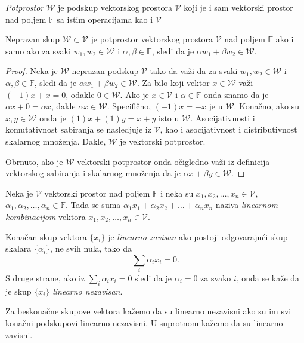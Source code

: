\documentclass{article}
\begin{document}
\begin{definition}
  \textit{Potprostor} $\mathcal{W}$ je podskup vektorskog prostora $\mathcal{V}$ koji je i sam vektorski prostor nad poljem $\mathbb{F}$ sa istim operacijama kao i $\mathcal{V}$
\end{definition}

\begin{theorem}
  Neprazan skup $\mathcal{W} \subset \mathcal{V}$ je potprostor vektorskog prostora $\mathcal{V}$ nad poljem $\mathbb{F}$ ako i samo ako za svaki $w_1, w_2 \in \mathcal{W}$ i $\alpha, \beta \in \mathbb{F}$, sledi da je $\alpha w_1 + \beta w_2 \in \mathcal{W}$.
\end{theorem}

\begin{proof}
  Neka je $\mathcal{W}$ neprazan podskup $\mathcal{V}$ tako da važi da za svaki $w_1, w_2 \in \mathcal{W}$ i $\alpha, \beta \in \mathbb{F}$, sledi da je $\alpha w_1 + \beta w_2 \in \mathcal{W}$.
  Za bilo koji vektor $x \in \mathcal{W}$ važi $(-1) x + x = 0$, odakle $0 \in \mathcal{W}$.
  Ako je $x \in \mathcal{V}$ i $\alpha \in \mathbb{F}$ onda znamo da je $\alpha x + 0 = \alpha x$, dakle $\alpha x \in \mathcal{W}$.
  Specifično, $(-1) x = -x$ je u $\mathcal{W}$.
  Konačno, ako su $x, y \in \mathcal{W}$ onda je $(1) x + (1) y = x + y$ isto u $\mathcal{W}$.
  Asocijativnosti i komutativnost sabiranja se nasledjuje iz $\mathcal{V}$, kao i asocijativnost i distributivnost skalarnog množenja.
  Dakle, $\mathcal{W}$ je vektorski potprostor.

  Obrnuto, ako je $\mathcal{W}$ vektorski potprostor onda očigledno važi iz definicija vektorskog sabiranja i skalarnog množenja da je $\alpha x + \beta y \in \mathcal{W}$.
\end{proof}

\begin{definition}
  Neka je $\mathcal{V}$ vektorski prostor nad poljem $\mathbb{F}$ i neka su $x_1, x_2, \ldots, x_n \in \mathcal{V}$, $\alpha_1, \alpha_2, \ldots, \alpha_n \in \mathbb{F}$.
  Tada se suma $\alpha_1 x_1 + \alpha_2 x_2 + \ldots + \alpha_n x_n$ naziva \textit{linearnom kombinacijom} vektora $x_1, x_2, \ldots, x_n \in \mathcal{V}$.
\end{definition}

\begin{definition}
  Konačan skup vektora $\{x_i\}$ je \textit{linearno zavisan} ako postoji odgovarajući skup skalara $\{\alpha_i\}$, ne svih nula, tako da
  \[\sum_{i} \alpha_i x_i = 0.\]
  S druge strane, ako iz $\sum_{i} \alpha_i x_i = 0$ sledi da je $\alpha_i = 0$ za svako $i$, onda se kaže da je skup $\{x_i\}$ \textit{linearno nezavisan}.
  
  Za beskonačne skupove vektora kažemo da su linearno nezavisni ako su im svi konačni podskupovi linearno nezavisni.
  U suprotnom kažemo da su linearno zavisni.
\end{definition}
\end{document}
